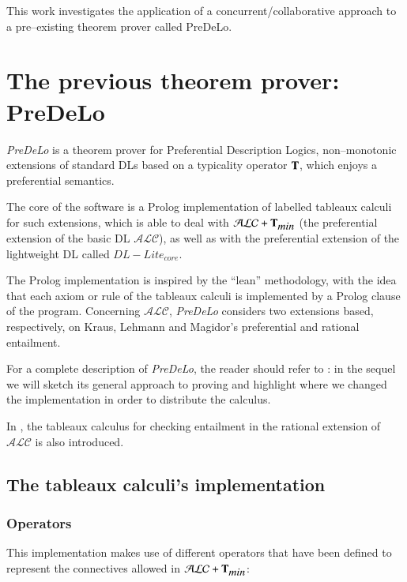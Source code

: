 \documentclass[a4paper, 11pt, oneside]{elsarticle}
\newcommand{\tip}{{\bf T}}
\newcommand{\alc}{\mathcal{ALC}}
\newcommand{\alctmin}{\mathcal{ALC}+\tip_{\mbox{\em min}}}
\begin{document}
This work investigates the application of a concurrent/collaborative approach to a pre--existing theorem prover called PreDeLo.

\section{The previous theorem prover: PreDeLo}\label{predelo}
\emph{PreDeLo} is a theorem prover for Preferential Description Logics, non--monotonic extensions of standard DLs based on a typicality operator $\tip$, which enjoys a preferential semantics.

The core of the software is a Prolog implementation of labelled tableaux calculi for such extensions, which is able to deal with $\alctmin$ (the preferential extension of the basic DL $\alc$), as well as with the preferential extension of the lightweight DL called $DL-Lite_{core}$.

The Prolog implementation is inspired by the ``lean'' methodology, with the idea that each axiom or rule of the tableaux calculi is implemented by a Prolog clause of the program.
Concerning $\alc$, \emph{PreDeLo} considers two extensions based, respectively, on Kraus, Lehmann and Magidor’s preferential and rational entailment.

For a complete description of \emph{PreDeLo}, the reader should refer to \cite{conf/aiia/GiordanoGJOP13}: in the sequel we will sketch its general approach to proving and highlight where we changed the implementation in order to distribute the calculus.

In \cite{conf/aiia/GiordanoGJOP13}, the tableaux calculus for checking entailment in the rational extension of $\alc$ is also introduced.

\subsection{The tableaux calculi's implementation}

\subsubsection{Operators}

This implementation makes use of different operators that have been defined to represent the connectives allowed in $\alctmin$:
\end{document}

